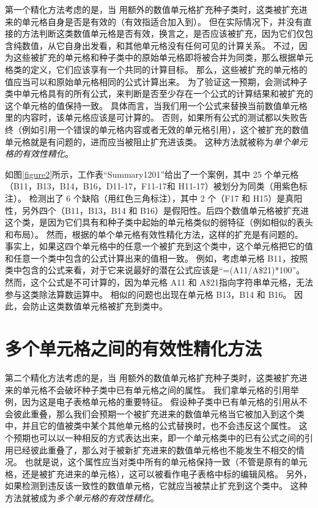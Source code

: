 第一个精化方法考虑的是，当 \wa 用额外的数值单元格扩充种子类时，这类被扩充进来的单元格自身是否是有效的（有效指适合加入到）。
但在实际情况下，并没有直接的方法判断这类数值单元格是否有效，换言之，是否应该被扩充，因为它们仅包含纯数值，从它自身出发看，和其他单元格没有任何可见的计算关系。
不过，因为这些被扩充的单元格和种子类中的原始单元格即将被合并为同类，那么根据单元格类的定义，它们应该享有一个共同的计算目标。
那么，这些被扩充的单元格的值应当可以和原始单元格相同的公式计算出来。
为了验证这一预期，\wa 会测试种子类中单元格具有的所有公式，来判断是否至少存在一个公式的计算结果和被扩充的这个单元格的值保持一致。
具体而言，当我们用一个公式来替换当前数值单元格里的内容时，该单元格应该是可计算的。
否则，如果所有公式的测试都以失败告终（例如引用一个错误的单元格内容或者无效的单元格引用），这个被扩充的数值单元格就是有问题的，进而应当被阻止扩充进该类。
这种方法就被称为\textit{单个单元格的有效性精化}。

如图\ref{figure2}所示，工作表“Summary1201”给出了一个案例，其中 25 个单元格（B11，B13，B14，B16，D11-17，F11-17和 H11-17）被\cu 划分为同类（用紫色标注）。
\cu 检测出了 6 个缺陷（用红色三角标注），其中 2 个（F17 和 H15）是真阳性，另外四个（B11，B13，B14 和 B16）是假阳性。后四个数值单元格被扩充进这个类，是因为它们具有和种子类中起始的单元格类似的弱特征（例如相似的表头和布局）。
然而，根据\wa 的单个单元格有效性精化方法，这样的扩充是有问题的。
事实上，如果这四个单元格中的任意一个被扩充到这个类中，这个单元格把它的值和任意一个类中包含的公式计算出来的值相一致。
例如，考虑单元格 B11，按照类中包含的公式来看，对于它来说最好的潜在公式应该是“=(A11/A\$21)*100”。
然而，这个公式是不可计算的，因为单元格 A11 和 A\$21指向字符串单元格，无法参与这类除法算数运算中。
相似的问题也出现在单元格 B13，B14 和 B16。 
因此，\wa 会防止这类数值单元格被扩充到类中。

\section{多个单元格之间的有效性精化方法}



第二个精化方法考虑的是，当 \wa 用额外的数值单元格扩充种子类时，这类被扩充进来的单元格不会破坏种子类中已有单元格之间的属性。
我们拿单元格的引用举例，因为这是电子表格单元格的重要特征。
假设种子类中已有单元格的引用从不会彼此重叠，那么我们会预期一个被扩充进来的数值单元格当它被加入到这个类中，并且它的值被类中某个其他单元格的公式替换时，也不会违反这个属性。
这个预期也可以以一种相反的方式表达出来，即一个单元格类中的已有公式之间的引用已经彼此重叠了，那么对于被新扩充进来的数值单元格也不能发生不相交的情况。
也就是说，这个属性应当对类中所有的单元格保持一致（不管是原有的单元格，还是被扩充进来的单元格），这可以被看作电子表格中标的编辑风格。
另外，如果检测到违反该一致性的数值单元格，它就应当被禁止扩充到这个类中。
这种方法就被成为\textit{多个单元格的有效性精化}。

